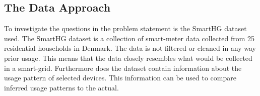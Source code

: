 \subsection{The Data Approach}
To investigate the questions in the problem statement is the SmartHG dataset used. The SmartHG dataset is a collection of smart-meter data collected from 25 residential households in Denmark. The data is not filtered or cleaned in any way prior usage. This means that the data closely resembles what would be collected in a smart-grid. Furthermore does the dataset contain information about the usage pattern of selected devices. This information can be used to compare inferred usage patterns to the actual. 
